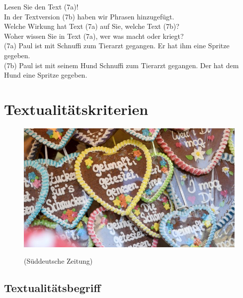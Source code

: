 \documentclass[
  letterpaper,
]{scrbook}
\begin{document}
Lesen Sie den Text (7a)!\\
In der Textversion (7b) haben wir Phrasen hinzugefügt.\\
Welche Wirkung hat Text (7a) auf Sie, welche Text (7b)?\\
Woher wissen Sie in Text (7a), wer was macht oder kriegt?\\

(7a) Paul ist mit Schnuffi zum Tierarzt gegangen. Er hat ihm eine
Spritze gegeben.\\

(7b) Paul ist mit seinem Hund Schnuffi zum Tierarzt gegangen. Der hat
dem Hund eine Spritze gegeben.\\

\hypertarget{sec-textkriterien}{%
\chapter{Textualitätskriterien}\label{sec-textkriterien}}

\begin{figure}

{\centering 

\href{https://www.sueddeutsche.de/muenchen/oktoberfest-muenchen-corona-zahlen-anstieg-1.5664515?utm_source=Twitter\&utm_medium=twitterbot\&utm_campaign=1.5664515}{\includegraphics[width=1\textwidth,height=\textheight]{./pictures/lebkuchenherzen_sueddeutsche_de_6TAFlTln.jpg}}

}

\caption{(Süddeutsche Zeitung)}

\end{figure}

\hypertarget{textualituxe4tsbegriff}{%
\section{Textualitätsbegriff}\label{textualituxe4tsbegriff}}
\end{document}
